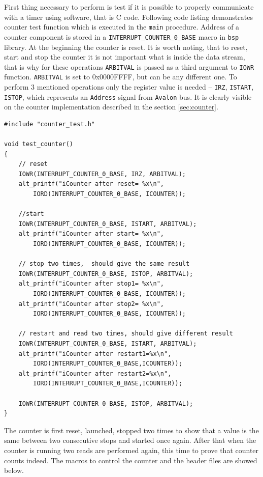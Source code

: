 First thing necessary to perform is test if it is possible to properly communicate with a timer using software, that is C code. Following code listing demonstrates counter test function which is executed in the \verb|main| procedure. Address of a counter component is stored in a  \verb|INTERRUPT_COUNTER_0_BASE| macro in \verb|bsp| library. At the beginning the counter is reset. It is worth noting, that to reset, start and stop the counter it is not important what is inside the data stream, that is why for these operations \verb|ARBITVAL| is passed as a third argument to \verb|IOWR| function. \verb|ARBITVAL| is set to 0x0000FFFF, but can be any different one. To perform 3 mentioned operations only the register value is needed -- \verb|IRZ|, \verb|ISTART|, \verb|ISTOP|, which represents an \verb|Address| signal from \verb|Avalon| bus. It is clearly visible on the counter implementation described in the section \ref{sec:counter}. 
\begin{lstlisting}[style=customc, frame=none]
#include "counter_test.h"

void test_counter()
{
    // reset
    IOWR(INTERRUPT_COUNTER_0_BASE, IRZ, ARBITVAL);
    alt_printf("iCounter after reset= %x\n", 
        IORD(INTERRUPT_COUNTER_0_BASE, ICOUNTER));
    
    //start
    IOWR(INTERRUPT_COUNTER_0_BASE, ISTART, ARBITVAL);
    alt_printf("iCounter after start= %x\n", 
        IORD(INTERRUPT_COUNTER_0_BASE, ICOUNTER));
    
    // stop two times,  should give the same result
    IOWR(INTERRUPT_COUNTER_0_BASE, ISTOP, ARBITVAL);
    alt_printf("iCounter after stop1= %x\n", 
        IORD(INTERRUPT_COUNTER_0_BASE, ICOUNTER));
    alt_printf("iCounter after stop2= %x\n", 
        IORD(INTERRUPT_COUNTER_0_BASE, ICOUNTER));
    
    // restart and read two times, should give different result
    IOWR(INTERRUPT_COUNTER_0_BASE, ISTART, ARBITVAL);
    alt_printf("iCounter after restart1=%x\n",
        IORD(INTERRUPT_COUNTER_0_BASE,ICOUNTER));
    alt_printf("iCounter after restart2=%x\n",
        IORD(INTERRUPT_COUNTER_0_BASE,ICOUNTER));
    
    IOWR(INTERRUPT_COUNTER_0_BASE, ISTOP, ARBITVAL);
}
\end{lstlisting}
The counter is first reset, launched, stopped two times to show that a value is the same between two consecutive stops and started once again. After that when the counter is running two reads are performed again, this time to prove that counter counts indeed. The macros to control the counter and the header files are showed below.
